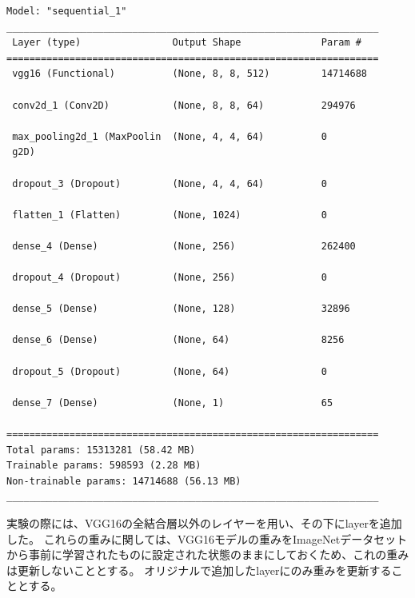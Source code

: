 \documentclass[a4paper, 11pt, titlepage]{jsarticle}
\begin{document}
{\fontsize{10pt}{9pt}\selectfont
\begin{verbatim}
Model: "sequential_1"
_________________________________________________________________
 Layer (type)                Output Shape              Param #   
=================================================================
 vgg16 (Functional)          (None, 8, 8, 512)         14714688  
                                                                 
 conv2d_1 (Conv2D)           (None, 8, 8, 64)          294976    
                                                                 
 max_pooling2d_1 (MaxPoolin  (None, 4, 4, 64)          0         
 g2D)                                                            
                                                                 
 dropout_3 (Dropout)         (None, 4, 4, 64)          0         
                                                                 
 flatten_1 (Flatten)         (None, 1024)              0         
                                                                 
 dense_4 (Dense)             (None, 256)               262400    
                                                                 
 dropout_4 (Dropout)         (None, 256)               0         
                                                                 
 dense_5 (Dense)             (None, 128)               32896     
                                                                 
 dense_6 (Dense)             (None, 64)                8256      
                                                                 
 dropout_5 (Dropout)         (None, 64)                0         
                                                                 
 dense_7 (Dense)             (None, 1)                 65        
                                                                 
=================================================================
Total params: 15313281 (58.42 MB)
Trainable params: 598593 (2.28 MB)
Non-trainable params: 14714688 (56.13 MB)
_________________________________________________________________
\end{verbatim}
}\par
実験の際には、VGG16の全結合層以外のレイヤーを用い、その下にlayerを追加した。
これらの重みに関しては、VGG16モデルの重みをImageNetデータセットから事前に学習されたものに設定された状態のままにしておくため、これの重みは更新しないこととする。
オリジナルで追加したlayerにのみ重みを更新することとする。
\end{document}
